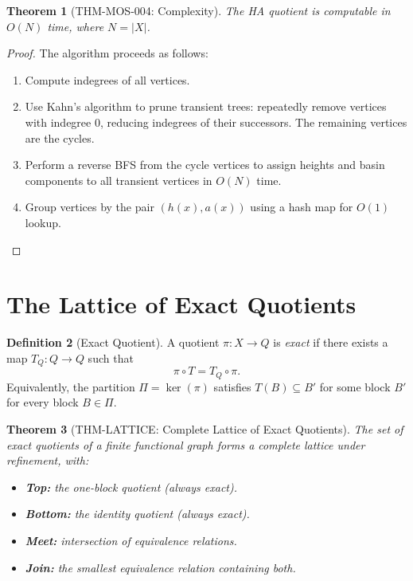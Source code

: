 \documentclass[11pt, a4paper]{article}
\newtheorem{theorem}{Theorem}[section]
\theoremstyle{definition}
\newtheorem{definition}[theorem]{Definition}
\theoremstyle{remark}
\begin{document}
\begin{theorem}[THM-MOS-004: Complexity]
The HA quotient is computable in \(O(N)\) time, where \(N = |X|\).
\end{theorem}

\begin{proof}
The algorithm proceeds as follows:
\begin{enumerate}
\item Compute indegrees of all vertices.
\item Use Kahn's algorithm to prune transient trees: repeatedly remove vertices with indegree 0, reducing indegrees of their successors. The remaining vertices are the cycles.
\item Perform a reverse BFS from the cycle vertices to assign heights and basin components to all transient vertices in \(O(N)\) time.
\item Group vertices by the pair \((h(x), a(x))\) using a hash map for \(O(1)\) lookup.
\end{enumerate}
\end{proof}

\section{The Lattice of Exact Quotients}

\begin{definition}[Exact Quotient]
A quotient \(\pi: X \to Q\) is \emph{exact} if there exists a map \(T_Q: Q \to Q\) such that
\[
\pi \circ T = T_Q \circ \pi.
\]
Equivalently, the partition \(\Pi = \ker(\pi)\) satisfies \(T(B) \subseteq B'\) for some block \(B'\) for every block \(B \in \Pi\).
\end{definition}

\begin{theorem}[THM-LATTICE: Complete Lattice of Exact Quotients]
The set of exact quotients of a finite functional graph forms a complete lattice under refinement, with:
\begin{itemize}
\item \textbf{Top:} the one-block quotient (always exact).
\item \textbf{Bottom:} the identity quotient (always exact).
\item \textbf{Meet:} intersection of equivalence relations.
\item \textbf{Join:} the smallest equivalence relation containing both.
\end{itemize}
\end{theorem}
\end{document}
